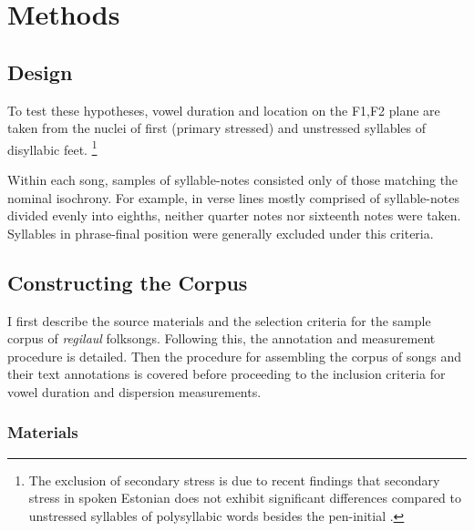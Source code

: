 \chapter{Methods}
%

\section{Design}
To test these hypotheses, vowel duration and location on the F1,F2 plane are taken from the nuclei of first (primary stressed) and unstressed syllables of disyllabic feet. \footnote{The exclusion of secondary stress is due to recent findings that secondary stress in spoken Estonian does not exhibit significant differences compared to unstressed syllables of polysyllabic words besides the pen-initial \cite{asuLippus2018}. }

Within each song, samples of syllable-notes consisted only of those matching the nominal isochrony. For example, in verse lines mostly comprised of syllable-notes divided evenly into eighths, neither quarter notes nor sixteenth notes were taken. Syllables in phrase-final position were generally excluded under this criteria. 



\section{Constructing the Corpus}

I first describe the source materials and the selection criteria for the sample corpus of {\it regilaul} folksongs. Following this, the annotation and measurement procedure is detailed. Then the procedure for assembling the corpus of songs and their text annotations is covered before proceeding to the inclusion criteria for vowel duration and dispersion measurements.

\subsection{Materials}




